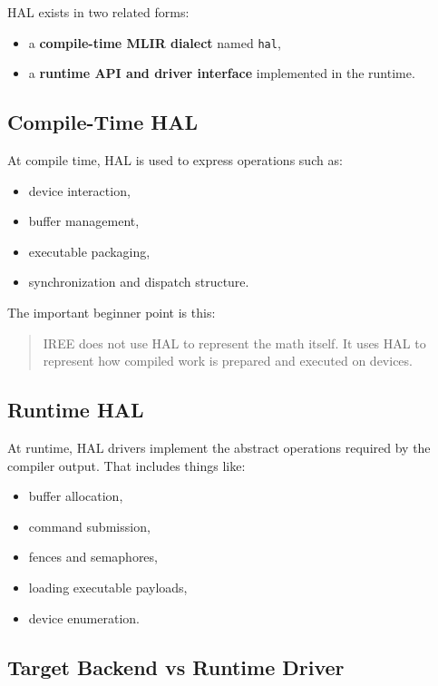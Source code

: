 \documentclass[11pt,a4paper]{article}
\begin{document}
HAL exists in two related forms:
\begin{itemize}
    \item a \textbf{compile-time MLIR dialect} named \texttt{hal},
    \item a \textbf{runtime API and driver interface} implemented in the runtime.
\end{itemize}

\subsection{Compile-Time HAL}

At compile time, HAL is used to express operations such as:
\begin{itemize}
    \item device interaction,
    \item buffer management,
    \item executable packaging,
    \item synchronization and dispatch structure.
\end{itemize}

The important beginner point is this:

\begin{quote}
IREE does not use HAL to represent the math itself. It uses HAL to represent how compiled work is prepared and executed on devices.
\end{quote}

\subsection{Runtime HAL}

At runtime, HAL drivers implement the abstract operations required by the compiler output. That includes things like:
\begin{itemize}
    \item buffer allocation,
    \item command submission,
    \item fences and semaphores,
    \item loading executable payloads,
    \item device enumeration.
\end{itemize}

\subsection{Target Backend vs Runtime Driver}
\end{document}
